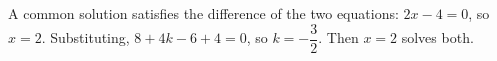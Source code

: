 A common solution satisfies the difference of the two equations: $2x-4=0$, so $x=2$. Substituting, $8+4k-6+4=0$, so $k=\boxed{-\dfrac32}$. Then $x=2$ solves both.
